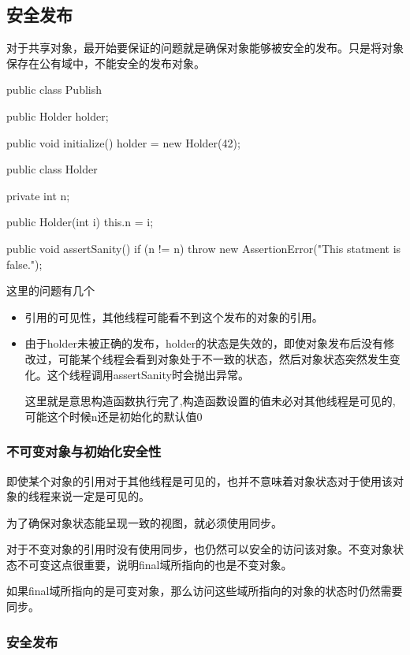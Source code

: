 \subsection{安全发布}

对于共享对象，最开始要保证的问题就是确保对象能够被安全的发布。只是将对象保存在公有域中，不能安全的发布对象。

\begin{Java}
public class Publish {

	public Holder holder;
	
	public void initialize() {
		holder = new Holder(42);
	}
}

public class Holder {
	
	private int n;

	public Holder(int i) {
		this.n = i;
	}

	public void assertSanity() {
		if (n != n) {
			throw new AssertionError("This statment is false.");
		}
	}
}
\end{Java}

这里的问题有几个
\begin{itemize}
\item 引用的可见性，其他线程可能看不到这个发布的对象的引用。
\item 由于holder未被正确的发布，holder的状态是失效的，即使对象发布后没有修改过，可能某个线程会看到对象处于不一致的状态，然后对象状态突然发生变化。这个线程调用assertSanity时会抛出异常。

这里就是意思构造函数执行完了,构造函数设置的值未必对其他线程是可见的,可能这个时候n还是初始化的默认值0

\end{itemize}

\subsubsection{不可变对象与初始化安全性}

即使某个对象的引用对于其他线程是可见的，也并不意味着对象状态对于使用该对象的线程来说一定是可见的。

为了确保对象状态能呈现一致的视图，就必须使用同步。

对于不变对象的引用时没有使用同步，也仍然可以安全的访问该对象。不变对象状态不可变这点很重要，说明final域所指向的也是不变对象。

如果final域所指向的是可变对象，那么访问这些域所指向的对象的状态时仍然需要同步。

\subsubsection{安全发布}

